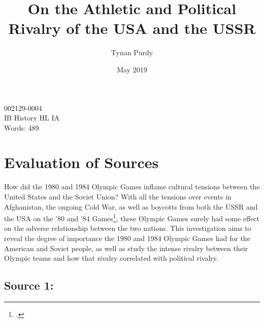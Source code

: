 \documentclass[12pt,letterpaper]{article}
\title{On the Athletic and Political Rivalry of the USA and the USSR}
\author{Tynan Purdy}
\date{May 2019}
\begin{document}
\large
\parindent=0.5in

{\fontsize{12}{14.4}
	{\singlespace
	    \maketitle
	    \begin{center}
	    002129-0004 \\
	    \vspace{4mm}
	    IB History HL IA \\
	    \vspace{4mm}
	    Words: 489 \\ %
	\end{center}
	}
}	

\newpage
\tableofcontents
{}
\newpage

\section{Evaluation of Sources}

How did the 1980 and 1984 Olympic Games inflame cultural tensions between the United States and the Soviet Union? With all the tensions over events in Afghanistan, the ongoing Cold War, as well as boycotts from both the USSR and the USA on the '80 and '84 Games\footcite[559]{guttmann}, these Olympic Games surely had some effect on the adverse relationship between the two nations. This investigation aims to reveal the degree of importance the 1980 and 1984 Olympic Games had for the American and Soviet people, as well as study the intense rivalry between their Olympic teams and how that rivalry correlated with political rivalry.

\subsection{Source 1: }
\end{document}
